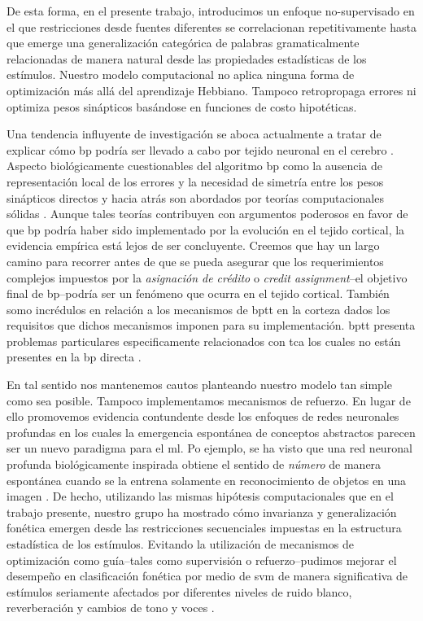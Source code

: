 {De esta forma, en el presente trabajo, introducimos un enfoque no-supervisado en el que restricciones desde fuentes diferentes se correlacionan repetitivamente hasta que emerge una generalización categórica de palabras gramaticalmente relacionadas de manera natural desde las propiedades estadísticas de los estímulos.
Nuestro modelo computacional no aplica ninguna forma de optimización más allá del aprendizaje Hebbiano. Tampoco retropropaga errores ni optimiza pesos sinápticos basándose en funciones de costo hipotéticas.


Una tendencia influyente de investigación se aboca actualmente a tratar de explicar cómo \gls{bp} podría ser llevado a cabo por tejido neuronal en el cerebro \cite{WHITTINGTON2019235}.
Aspecto biológicamente cuestionables del algoritmo \gls{bp} como la ausencia de representación local de los errores y la necesidad de simetría entre los pesos sinápticos directos y hacia atrás son abordados por teorías computacionales sólidas \cite{10.7554/eLife.22901, Lillicrap_2016}.
Aunque tales teorías contribuyen con argumentos poderosos en favor de que \gls{bp} podría haber sido implementado por la evolución en el tejido cortical, la evidencia empírica está lejos de ser concluyente.
Creemos que hay un largo camino para recorrer antes de que se pueda asegurar que los requerimientos complejos impuestos por la \emph{asignación de crédito} o \emph{credit assignment}--el objetivo final de \gls{bp}--podría ser un fenómeno que ocurra en el tejido cortical.
También somo incrédulos en relación a los mecanismos de \gls{bptt} en la corteza dados los requisitos que dichos mecanismos imponen para su implementación.
\gls{bptt} presenta problemas particulares especificamente relacionados con \gls{tca} los cuales no están presentes en la \gls{bp} directa \cite{LILLICRAP201982}.


En tal sentido nos mantenemos cautos planteando nuestro modelo tan simple como sea posible. Tampoco implementamos mecanismos de refuerzo.
En lugar de ello promovemos evidencia contundente desde los enfoques de redes neuronales profundas en los cuales la emergencia espontánea de conceptos abstractos parecen ser un nuevo paradigma para el \gls{ml}.
Po ejemplo, se ha visto que una red neuronal profunda biológicamente inspirada obtiene el sentido de \emph{número} de manera espontánea cuando se la entrena solamente en reconocimiento de objetos en una imagen \cite{Nasreaav7903}.
De hecho, utilizando las mismas hipótesis computacionales que en el trabajo presente, nuestro grupo ha mostrado cómo invarianza y generalización fonética emergen desde las restricciones secuenciales impuestas en la estructura estadística de los estímulos.
Evitando la utilización de mecanismos de optimización como guía--tales como supervisión o refuerzo--pudimos mejorar el desempeño en clasificación fonética por medio de \gls{svm} de manera significativa de estímulos seriamente afectados por diferentes niveles de ruido blanco, reverberación y cambios de tono y voces \cite{10.1371/journal.pone.0217966}.

}
